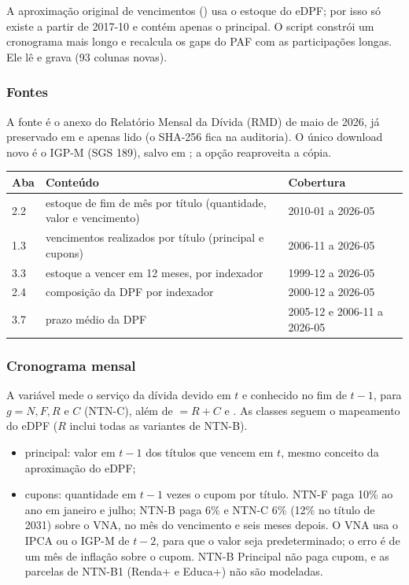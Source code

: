 \documentclass[12pt,a4paper]{article}
\begin{document}
A aproximação original de vencimentos () usa o
estoque do eDPF; por isso só existe a partir de 2017-10 e contém apenas o principal.
O script  constrói um cronograma mais longo e
recalcula os gaps do PAF com as participações longas. Ele lê
 e grava
 (93 colunas novas).

\subsubsection{Fontes}

A fonte é o anexo do Relatório Mensal da Dívida (RMD) de maio de 2026, já preservado
em  e apenas lido (o SHA-256
fica na auditoria). O único download novo é o IGP-M (SGS 189), salvo em
; a opção  reaproveita a cópia.

\begin{longtable}{p{}p{}p{}}
\toprule
\textbf{Aba} & \textbf{Conteúdo} & \textbf{Cobertura} \\
\midrule
\endhead
2.2 & estoque de fim de mês por título (quantidade, valor e vencimento) & 2010-01 a 2026-05 \\
1.3 & vencimentos realizados por título (principal e cupons) & 2006-11 a 2026-05 \\
3.3 & estoque a vencer em 12 meses, por indexador & 1999-12 a 2026-05 \\
2.4 & composição da DPF por indexador & 2000-12 a 2026-05 \\
3.7 & prazo médio da DPF & 2005-12 e 2006-11 a 2026-05 \\
\bottomrule
\end{longtable}

\subsubsection{Cronograma mensal}

A variável  mede o serviço da dívida devido em \(t\) e
conhecido no fim de \(t-1\), para \(g = N, F, R\) e \(C\) (NTN-C), além de
 \(= R + C\) e . As classes seguem o mapeamento do eDPF
(\(R\) inclui todas as variantes de NTN-B).
\begin{itemize}[leftmargin=1.2cm]
    \item principal: valor em \(t-1\) dos títulos que vencem em \(t\), mesmo conceito
    da aproximação do eDPF;
    \item cupons: quantidade em \(t-1\) vezes o cupom por título. NTN-F paga 10\% ao ano
    em janeiro e julho; NTN-B paga 6\% e NTN-C 6\% (12\% no título de 2031) sobre o
    VNA, no mês do vencimento e seis meses depois. O VNA usa o IPCA ou o IGP-M de
    \(t-2\), para que o valor seja predeterminado; o erro é de um mês de inflação
    sobre o cupom. NTN-B Principal não paga cupom, e as parcelas de NTN-B1
    (Renda+ e Educa+) não são modeladas.
\end{itemize}
\end{document}
